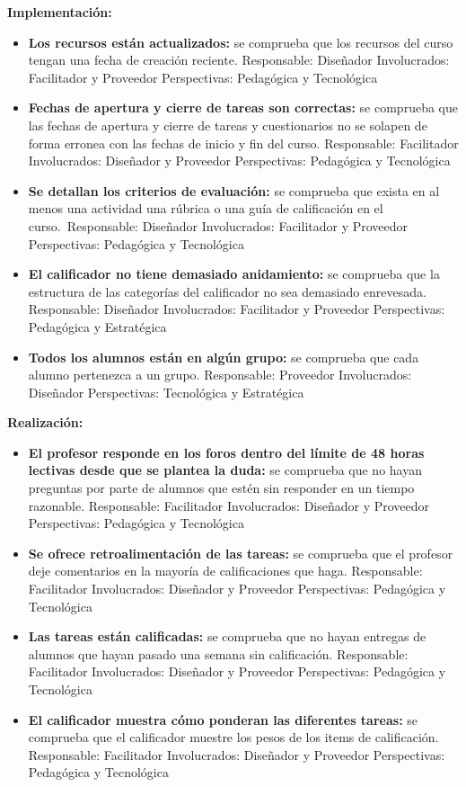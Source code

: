 \textbf{Implementación:}

\begin{itemize}
	\item
	\textbf{Los recursos están actualizados:} se comprueba que los
	recursos del curso tengan una fecha de creación reciente.
	{Responsable:} Diseñador {Involucrados:} Facilitador y
	Proveedor {Perspectivas:} Pedagógica y Tecnológica
	\item
	\textbf{Fechas de apertura y cierre de tareas son correctas:} se
	comprueba que las fechas de apertura y cierre de tareas y
	cuestionarios no se solapen de forma erronea con las fechas de inicio
	y fin del curso. {Responsable:} Facilitador
	{Involucrados:} Diseñador y Proveedor {Perspectivas:}
	Pedagógica y Tecnológica
	\item
	\textbf{Se detallan los criterios de evaluación:} se comprueba que
	exista en al menos una actividad una rúbrica o una guía de calificación
	en el curso.~{Responsable:} Diseñador {Involucrados:}
	Facilitador y Proveedor {Perspectivas:} Pedagógica y Tecnológica
	\item
	\textbf{El calificador no tiene demasiado anidamiento:} se comprueba
	que la estructura de las categorías del calificador no sea demasiado
	enrevesada. {Responsable:} Diseñador {Involucrados:}
	Facilitador y Proveedor {Perspectivas:} Pedagógica y Estratégica
	\item
	\textbf{Todos los alumnos están en algún grupo:} se comprueba que cada
	alumno pertenezca a un grupo. {Responsable:} Proveedor
	{Involucrados:} Diseñador {Perspectivas:} Tecnológica y
	Estratégica
\end{itemize}

\textbf{Realización:}

\begin{itemize}
	\item
	\textbf{El profesor responde en los foros dentro del límite de 48
		horas lectivas desde que se plantea la duda:} se comprueba que no
	hayan preguntas por parte de alumnos que estén sin responder en un
	tiempo razonable. {Responsable:} Facilitador
	{Involucrados:} Diseñador y Proveedor {Perspectivas:}
	Pedagógica y Tecnológica
	\item
	\textbf{Se ofrece retroalimentación de las tareas:} se comprueba que
	el profesor deje comentarios en la mayoría de calificaciones que haga.
	{Responsable:} Facilitador {Involucrados:} Diseñador y
	Proveedor {Perspectivas:} Pedagógica y Tecnológica
	\item
	\textbf{Las tareas están calificadas:} se comprueba que no hayan
	entregas de alumnos que hayan pasado una semana sin calificación.
	{Responsable:} Facilitador {Involucrados:} Diseñador y
	Proveedor {Perspectivas:} Pedagógica y Tecnológica
	\item
	\textbf{El calificador muestra cómo ponderan las diferentes tareas:}
	se comprueba que el calificador muestre los pesos de los items de
	calificación. {Responsable:} Facilitador {Involucrados:}
	Diseñador y Proveedor {Perspectivas:} Pedagógica y Tecnológica
\end{itemize}

